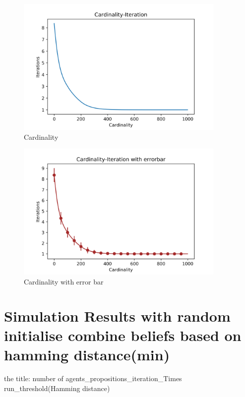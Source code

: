 \documentclass[a4paper,12pt]{article}
\begin{document}
    \begin{figure}[H]
    	\centering
    	\includegraphics[width=0.9\textwidth]{Card50_4_1000_1500_e3}
    	\caption{Cardinality}\label{Card50_4_1000_1500_e3}
    \end{figure}
    \begin{figure}[H]
    	\centering
    	\includegraphics[width=0.9\textwidth]{CardErr50_4_1000_1500_e3}
    	\caption{Cardinality with error bar}\label{CardErr50_4_1000_1500_e3}
    \end{figure}
	\section{Simulation Results with random initialise combine beliefs based on hamming distance(min)}
	the title: number of agents\_propositions\_iteration\_Times run\_threshold(Hamming distance)
    \graphicspath{{figsHamm/}}
\end{document}
